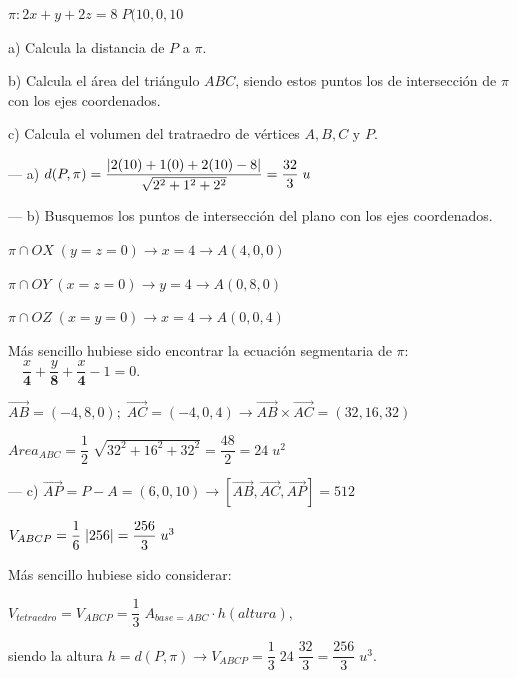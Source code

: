 \begin{ejre}
	$\pi:2x+y+2z=8\; P(10,0,10$
	
a) Calcula la distancia de $P$ a $\pi$.

b) Calcula el área del triángulo $ABC$, siendo estos puntos los de intersección de $\pi$ con los ejes coordenados.

c) Calcula el volumen del tratraedro de vértices $A,B,C \text{ y } P$. 
\end{ejre}
\begin{proofw}\renewcommand{\qedsymbol}{$\diamond$}	
\noindent --- a) $d(P,\pi)=\dfrac {\abs{2(10)+1(0)+2(10)-8}}{\sqrt{2^2+1^2+2^2}}=\dfrac {32} 3 \; u$
	
\noindent --- b) Busquemos los puntos de intersección del plano con los ejes coordenados.

\noindent $\pi\cap OX \; (y=z=0)\to x=4\to A(4,0,0)$

\noindent $\pi\cap OY \; (x=z=0)\to y=4\to A(0,8,0)$

\noindent $\pi\cap OZ \; (x=y=0)\to x=4\to A(0,0,4)$

\noindent \textcolor{gris}{Más sencillo hubiese sido encontrar la ecuación segmentaria de $\pi$: $\quad \dfrac{x}{\boldsymbol{4}}+\dfrac{y}{\boldsymbol{8}}+\dfrac{x}{\boldsymbol{4}}-1=0$.}

\noindent $\overrightarrow{AB}=(-4,8,0);\; \overrightarrow{AC}=(-4,0,4) \to \overrightarrow{AB} \times \overrightarrow{AC}=(32,16,32)$

\noindent $Area_{ABC}=\dfrac 1 2\; \sqrt{32^2+16^2+32^2}=\dfrac {48} 2 = 24\; u^2$

\noindent --- c) $\overrightarrow{AP}=P-A=(6,0,10) \to [\overrightarrow{AB},\overrightarrow{AC},\overrightarrow{AP}]=512$

\noindent $V_{ABCP}=\dfrac 1 6 \; \abs{256} =\dfrac {256}{3} \; u^3$

\noindent \textcolor{gris}{Más sencillo hubiese sido considerar:} 

\noindent \textcolor{gris}{$V_{tetraedro}=V_{ABCP}=\dfrac 1 3 \; A_{base=ABC} \cdot h(altura)$, }

\noindent \textcolor{gris}{siendo la altura $h=d(P,\pi) \to V_{ABCP}=\dfrac 1 3 \; 24\; \dfrac {32}{3}=\dfrac {256}{3}\; u^3$.}
\end{proofw}


